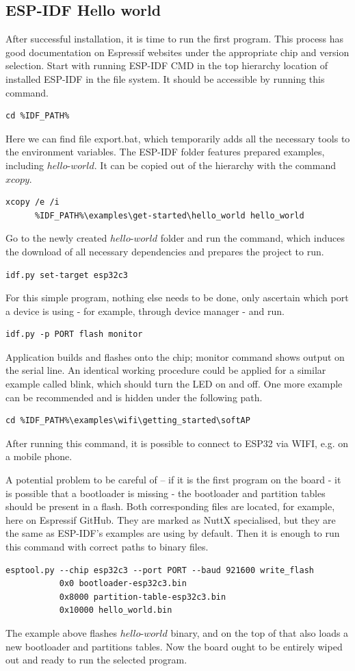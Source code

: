 \documentclass{ctuthesis}
\begin{document}
 \subsection{ESP-IDF Hello world}
 After successful installation, it is time to run the first program. This process has good documentation on Espressif websites under the appropriate chip and version selection. Start with running ESP-IDF CMD in the top hierarchy location of installed ESP-IDF in the file system. It should be accessible by running this command.
\begin{verbatim}
cd %IDF_PATH%
\end{verbatim}
Here we can find file export.bat, which temporarily adds all the necessary tools to the environment variables.
The ESP-IDF folder features prepared examples, including $hello\text{-}world$. It can be copied out of the hierarchy with the command $xcopy$.
\begin{verbatim}
xcopy /e /i
      %IDF_PATH%\examples\get-started\hello_world hello_world
\end{verbatim}
Go to the newly created $hello\text{-}world$ folder and run the command, which induces the download of all necessary dependencies and prepares the project to run.
\begin{verbatim}
idf.py set-target esp32c3
\end{verbatim}
For this simple program, nothing else needs to be done, only ascertain which port  a device is using - for example, through device manager - and run.
\begin{verbatim}
idf.py -p PORT flash monitor
\end{verbatim}
Application builds and flashes onto the chip; monitor command shows output on the serial line. An identical working procedure could be applied for a similar example called blink, which should turn the LED on and off. One more example can be recommended and is hidden under the following path.
\begin{verbatim}
cd %IDF_PATH%\examples\wifi\getting_started\softAP
\end{verbatim}
After running this command, it is possible to connect to ESP32 via WIFI, e.g. on a mobile phone.\newline

\quad A potential problem to be careful of – if it is the first program on the board - it is possible that a bootloader is missing - the bootloader and partition tables should be present in a flash\cite{esp-idf-bootloader}. Both corresponding files are located, for example, here on Espressif GitHub. They are marked as NuttX specialised, but they are the same as ESP-IDF's examples are using by default. Then it is enough to run this command with correct paths to binary files.
\begin{verbatim}
esptool.py --chip esp32c3 --port PORT --baud 921600 write_flash
           0x0 bootloader-esp32c3.bin
           0x8000 partition-table-esp32c3.bin
           0x10000 hello_world.bin
\end{verbatim}
The example above flashes $hello\text{-}world$ binary, and on the top of that also loads a new bootloader and partitions tables. Now the board ought to be entirely wiped out and ready to run the selected program. 
 
\end{document}
